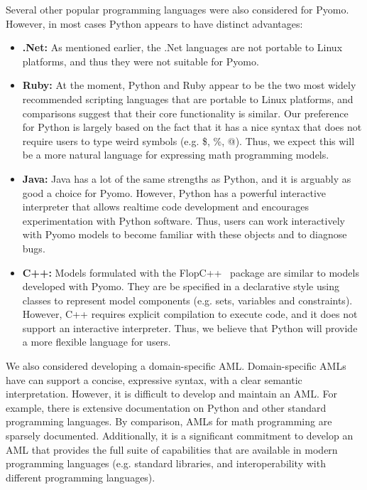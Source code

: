 Several other popular programming languages were also considered for Pyomo.  However, in most cases Python appears to have distinct advantages:
\begin{itemize}

\item {\bf .Net:} As mentioned earlier, the .Net languages are not
portable to Linux platforms, and thus they were not suitable for Pyomo.

\item {\bf Ruby:} At the moment, Python and Ruby appear to be the two
most widely recommended scripting languages that are portable to Linux
platforms, and comparisons suggest that their core functionality is
similar.  Our preference for Python is largely based on the fact that
it has a nice syntax that does not require users to type weird symbols
(e.g. \$, \%, @).  Thus, we expect this will be a more natural language
for expressing math programming models.

\item {\bf Java:} Java has a lot of the same strengths as Python, and
it is arguably as good a choice for Pyomo.  However, Python has a
powerful interactive interpreter that allows realtime code development
and encourages experimentation with Python software.  Thus, users can work
interactively with Pyomo models to become familiar with these objects and
to diagnose bugs.  

\item {\bf C++:} Models formulated with the FlopC++~\citep{flopcpp}
package are similar to models developed with Pyomo.  They are be
specified in a declarative style using classes to represent model
components (e.g. sets, variables and constraints).  However, C++
requires explicit compilation to execute code, and it does not support
an interactive interpreter.  Thus, we believe that Python will provide
a more flexible language for users.

\end{itemize}

We also considered developing a domain-specific AML.  Domain-specific
AMLs have can support a concise, expressive syntax, with a clear semantic
interpretation.  However, it is difficult to develop and maintain an AML.
For example, there is extensive documentation on Python and other standard
programming languages.   By comparison, AMLs for math programming are
sparsely documented.  Additionally, it is a significant commitment to
develop an AML that provides the full suite of capabilities that are
available in modern programming languages (e.g. standard libraries,
and interoperability with different programming languages).

